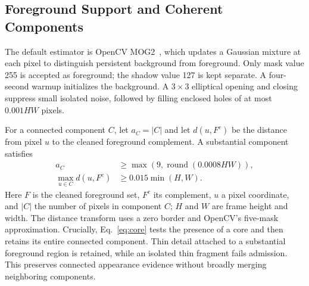 \documentclass[conference]{IEEEtran}
\begin{document}
\subsection{Foreground Support and Coherent Components}
The default estimator is OpenCV MOG2~\cite{zivkovic2004,opencvmog2}, which updates a Gaussian mixture at each pixel to distinguish persistent background from foreground. Only mask value 255 is accepted as foreground; the shadow value 127 is kept separate. A four-second warmup initializes the background. A $3\times3$ elliptical opening and closing suppress small isolated noise, followed by filling enclosed holes of at most $0.001HW$ pixels.

For a connected component $C$, let $a_C=|C|$ and let $d(u,F^c)$ be the distance from pixel $u$ to the cleaned foreground complement. A substantial component satisfies
\begin{equation}
\begin{aligned}
a_C &\ge \max(9,\operatorname{round}(0.0008HW)),\\
\max_{u\in C}d(u,F^c)&\ge0.015\min(H,W).
\end{aligned}
\label{eq:core}
\end{equation}
Here $F$ is the cleaned foreground set, $F^c$ its complement, $u$ a pixel coordinate, and $|C|$ the number of pixels in component $C$; $H$ and $W$ are frame height and width. The distance transform uses a zero border and OpenCV's five-mask approximation. Crucially, Eq.~\eqref{eq:core} tests the presence of a core and then retains its entire connected component. Thin detail attached to a substantial foreground region is retained, while an isolated thin fragment fails admission. This preserves connected appearance evidence without broadly merging neighboring components.
\end{document}
